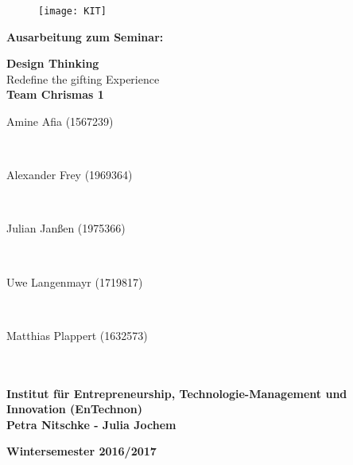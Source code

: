 \documentclass[12pt,ngerman, fleqn]{book} %
\begin{document}
\thispagestyle{empty}

\vfill
 \begin{center}
    \begin{figure}[t]
     \centering
            \texttt{[image: KIT]}\\[0.3in]
     \end{figure}
    
    \par\normalfont\fontsize{27}{27}\sffamily\selectfont
    {\textbf{Ausarbeitung zum Seminar:}} \\
    \par\normalfont\fontsize{30}{30}\sffamily\selectfont
    {\textbf{Design Thinking}} \\
    {\Large Redefine the gifting Experience}  \\ 


    \vspace*{1in}
    {\Large \bfseries Team Chrismas 1}  \\
    \begin{large}  Amine Afia (1567239) 
    \end{large}\\
    
    \begin{large}  Alexander Frey (1969364)
    \end{large}\\

    \begin{large} Julian Janßen (1975366)
    \end{large}\\

    \begin{large} Uwe Langenmayr (1719817)
    \end{large}\\
    
    \begin{large} Matthias Plappert (1632573)
    \end{large}\\

    \vspace*{2.7cm}
    \noindent \\
    \large\bfseries{Institut für Entrepreneurship, Technologie-Management und Innovation (EnTechnon)} \\
    \large\bfseries{Petra Nitschke - Julia Jochem} \\
    \vfill
    
    \large\bfseries{ Wintersemester 2016/2017}
\end{center}
\end{document}
